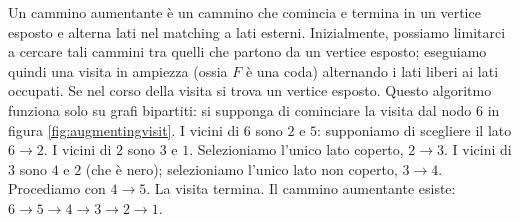 \noindent
\newline
Un cammino aumentante è un cammino che comincia e termina in un vertice esposto e
alterna lati nel matching a lati esterni. Inizialmente, possiamo limitarci
a cercare tali cammini tra quelli che partono da un vertice esposto;
eseguiamo quindi una visita in ampiezza (ossia $F$ è una coda) alternando i lati
liberi ai lati occupati. Se nel corso della visita si trova un vertice
esposto. Questo algoritmo funziona solo su grafi
bipartiti: si supponga di cominciare la visita dal nodo $6$ in figura \ref{fig:augmentingvisit}.
I vicini di $6$ sono $2$ e $5$: supponiamo di scegliere il lato $6 \rightarrow 2$.
I vicini di $2$ sono $3$ e $1$. Selezioniamo l'unico lato coperto,
$2 \rightarrow 3$. I vicini di $3$ sono $4$ e $2$ (che è nero);
selezioniamo l'unico lato non coperto, $3 \rightarrow 4$.
Procediamo con $4\rightarrow 5$. La visita termina.
Il cammino aumentante esiste:
$6 \rightarrow 5 \rightarrow 4 \rightarrow 3 \rightarrow 2 \rightarrow 1$.

